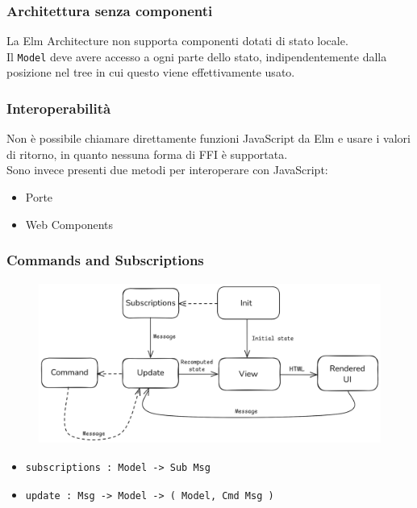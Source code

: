 \documentclass{beamer}
\begin{document}
\begin{frame}
  \frametitle{Architettura senza componenti}
  La Elm Architecture non supporta componenti dotati di stato locale.\\

  Il \texttt{Model} deve avere accesso a ogni parte dello stato, indipendentemente dalla posizione nel tree in cui questo viene effettivamente usato.
\end{frame}

\begin{frame}
  \frametitle{Interoperabilità}
  Non è possibile chiamare direttamente funzioni JavaScript da Elm e usare i valori di ritorno, in quanto nessuna forma di FFI è supportata.\\

  Sono invece presenti due metodi per interoperare con JavaScript:
  \vspace{3pt}
  \begin{itemize}
    \item Porte
    \item Web Components
  \end{itemize}

\end{frame}

\begin{frame}[containsverbatim]
  \frametitle{Commands and Subscriptions}
  \begin{figure}
    \centering
    \includegraphics[height=150pt]{assets/elm-architecture-xt.png}
  \end{figure}
  \begin{itemize}
      \item\begin{verbatim}
subscriptions : Model -> Sub Msg
      \end{verbatim}
      \item\begin{verbatim}
update : Msg -> Model -> ( Model, Cmd Msg )
      \end{verbatim}
  \end{itemize}

\end{frame}
\end{document}
